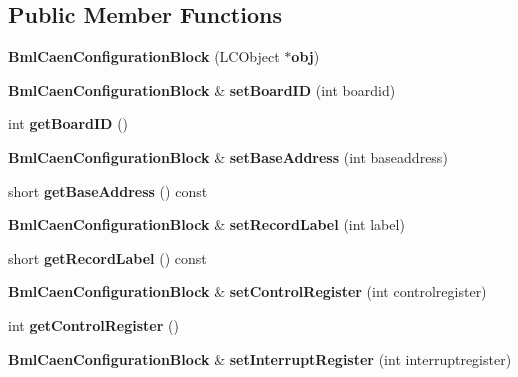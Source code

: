 \subsection*{Public Member Functions}
\begin{DoxyCompactItemize}
\item 
{\bfseries Bml\-Caen\-Configuration\-Block} (L\-C\-Object $\ast${\bf obj})\label{classCALICE_1_1BmlCaenConfigurationBlock_a15ef15c6db9d50ae58e65f2c98ed73bd}

\item 
{\bf Bml\-Caen\-Configuration\-Block} \& {\bfseries set\-Board\-I\-D} (int boardid)\label{classCALICE_1_1BmlCaenConfigurationBlock_a59fe78bec24532de95313aef863c9ff2}

\item 
int {\bfseries get\-Board\-I\-D} ()\label{classCALICE_1_1BmlCaenConfigurationBlock_a360a11a0204d58df71637193c4b9ead1}

\item 
{\bf Bml\-Caen\-Configuration\-Block} \& {\bfseries set\-Base\-Address} (int baseaddress)\label{classCALICE_1_1BmlCaenConfigurationBlock_a079fc5fd9026b0ef6c05fe33317290e9}

\item 
short {\bfseries get\-Base\-Address} () const \label{classCALICE_1_1BmlCaenConfigurationBlock_a8e7b031737715e85f55e8b4125d0b76b}

\item 
{\bf Bml\-Caen\-Configuration\-Block} \& {\bfseries set\-Record\-Label} (int label)\label{classCALICE_1_1BmlCaenConfigurationBlock_ac272a9c66fd223224a2a200cb7d2a66b}

\item 
short {\bfseries get\-Record\-Label} () const \label{classCALICE_1_1BmlCaenConfigurationBlock_aa8b83429f623d10f65edabe8a8b5a4a1}

\item 
{\bf Bml\-Caen\-Configuration\-Block} \& {\bfseries set\-Control\-Register} (int controlregister)\label{classCALICE_1_1BmlCaenConfigurationBlock_adf3f1a86fc1b8e1088669ae247dc96a6}

\item 
int {\bfseries get\-Control\-Register} ()\label{classCALICE_1_1BmlCaenConfigurationBlock_acbcca488fd13727aa889f6ad53c8f4dc}

\item 
{\bf Bml\-Caen\-Configuration\-Block} \& {\bfseries set\-Interrupt\-Register} (int interruptregister)\label{classCALICE_1_1BmlCaenConfigurationBlock_aebab0b05f74576366201b44bee1752a6}


\end{DoxyCompactItemize}
